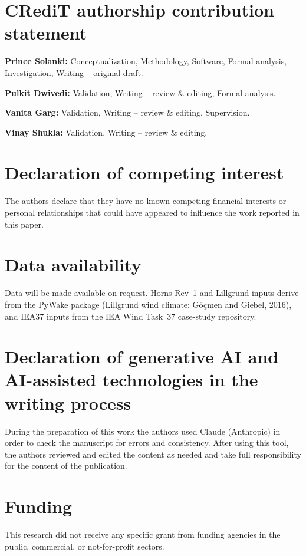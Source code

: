 \section*{CRediT authorship contribution statement}
\noindent\textbf{Prince Solanki:} Conceptualization, Methodology, Software, Formal analysis, Investigation, Writing -- original draft.

\noindent\textbf{Pulkit Dwivedi:} Validation, Writing -- review \& editing, Formal analysis.

\noindent\textbf{Vanita Garg:} Validation, Writing -- review \& editing, Supervision.

\noindent\textbf{Vinay Shukla:} Validation, Writing -- review \& editing.

\section*{Declaration of competing interest}
The authors declare that they have no known competing financial interests or personal relationships that could have appeared to influence the work reported in this paper.

\section*{Data availability}
Data will be made available on request. Horns Rev~1 and Lillgrund inputs derive from the PyWake package (Lillgrund wind climate: G\"o\c{c}men and Giebel, 2016), and IEA37 inputs from the IEA Wind Task~37 case-study repository.

\section*{Declaration of generative AI and AI-assisted technologies in the writing process}
During the preparation of this work the authors used Claude (Anthropic) in order to check the manuscript for errors and consistency. After using this tool, the authors reviewed and edited the content as needed and take full responsibility for the content of the publication.

\section*{Funding}
This research did not receive any specific grant from funding agencies in the public, commercial, or not-for-profit sectors.
